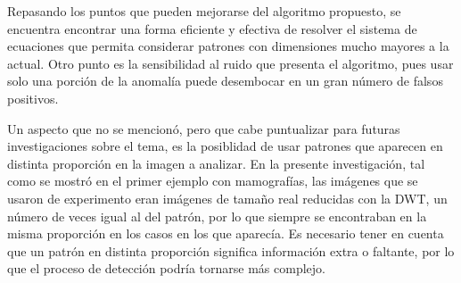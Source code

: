 \begin{recomendations}
    \par Repasando los puntos que pueden mejorarse del algoritmo propuesto, se encuentra encontrar una forma eficiente y efectiva de resolver el sistema de ecuaciones que permita considerar patrones con dimensiones mucho mayores a la actual. Otro punto es la sensibilidad al ruido que presenta el algoritmo, pues usar solo una porci\'on de la anomal\'ia puede desembocar en un gran n\'umero de falsos positivos.
    \par Un aspecto que no se mencion\'o, pero que cabe puntualizar para futuras investigaciones sobre el tema, es la posiblidad de usar patrones que aparecen en distinta proporci\'on en la imagen a analizar. En la presente investigaci\'on, tal como se mostr\'o en el primer ejemplo con mamograf\'ias, las im\'agenes que se usaron de experimento eran im\'agenes de tama\~no real reducidas con la DWT, un n\'umero de veces igual al del patr\'on, por lo que siempre se encontraban en la misma proporci\'on en los casos en los que aparec\'ia. Es necesario tener en cuenta que un patr\'on en distinta proporci\'on significa informaci\'on extra o faltante, por lo que el proceso de detecci\'on podr\'ia tornarse m\'as complejo.
\end{recomendations}
